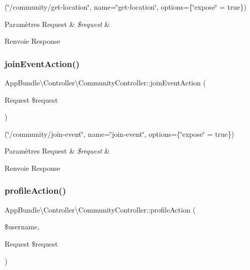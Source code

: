 (\char`\"{}/community/get-\/location\char`\"{}, name=\char`\"{}get-\/location\char`\"{}, options=\{\char`\"{}expose\char`\"{} = true\}) 
\begin{DoxyParams}[1]{Paramètres}
Request & {\em \$request} & \\
\hline
\end{DoxyParams}
\begin{DoxyReturn}{Renvoie}
Response 
\end{DoxyReturn}
\mbox{\label{classAppBundle_1_1Controller_1_1CommunityController_a0086746446df9fc76784d057babe7708}} 
\subsubsection{\texorpdfstring{join\+Event\+Action()}{joinEventAction()}}
{\footnotesize\ttfamily App\+Bundle\textbackslash{}\+Controller\textbackslash{}\+Community\+Controller\+::join\+Event\+Action (\begin{DoxyParamCaption}\item[{Request}]{\$request }\end{DoxyParamCaption})}

(\char`\"{}/community/join-\/event\char`\"{}, name=\char`\"{}join-\/event\char`\"{}, options=\{\char`\"{}expose\char`\"{} = true\}) 
\begin{DoxyParams}[1]{Paramètres}
Request & {\em \$request} & \\
\hline
\end{DoxyParams}
\begin{DoxyReturn}{Renvoie}
Response 
\end{DoxyReturn}
\mbox{\label{classAppBundle_1_1Controller_1_1CommunityController_a9a16d7753fcbdaa82cd3f56d5b117389}} 
\subsubsection{\texorpdfstring{profile\+Action()}{profileAction()}}
{\footnotesize\ttfamily App\+Bundle\textbackslash{}\+Controller\textbackslash{}\+Community\+Controller\+::profile\+Action (\begin{DoxyParamCaption}\item[{}]{\$username,  }\item[{Request}]{\$request }\end{DoxyParamCaption})}

